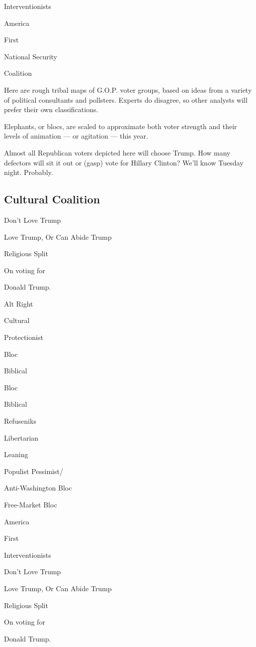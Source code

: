 Interventionists

America

First

National Security

Coalition

Here are rough tribal maps of G.O.P. voter groups, based on ideas from a
variety of political consultants and pollsters. Experts do disagree, so
other analysts will prefer their own classifications.

Elephants, or blocs, are scaled to approximate both voter strength and
their levels of animation --- or agitation --- this year.

Almost all Republican voters depicted here will choose Trump. How many
defectors will sit it out or (gasp) vote for Hillary Clinton? We'll know
Tuesday night. Probably.

\hypertarget{cultural-coalition}{%
\subsection{Cultural Coalition}\label{cultural-coalition}}

Don't Love Trump

Love Trump, Or Can Abide Trump

Religious Split

On voting for

Donald Trump.

Alt Right

Cultural

Protectionist

Bloc

Biblical

Bloc

Biblical

Refuseniks

Libertarian

Leaning

Populist Pessimist/

Anti-Washington Bloc

Free-Market Bloc

America

First

Interventionists

Don't Love Trump

Love Trump, Or Can Abide Trump

Religious Split

On voting for

Donald Trump.

